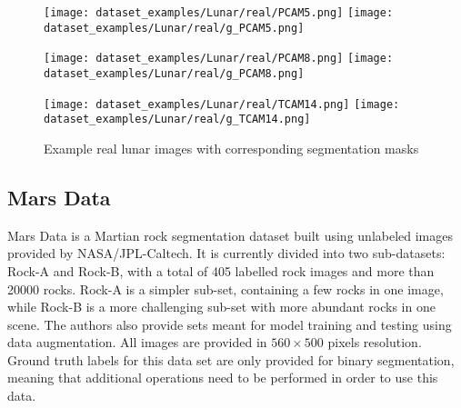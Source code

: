 \documentclass[a4paper,twoside,12pt]{book}
\begin{document}
\begin{figure}[!h]
    \centering
    \texttt{[image: dataset\_examples/Lunar/real/PCAM5.png]}
    \texttt{[image: dataset\_examples/Lunar/real/g\_PCAM5.png]}

    \texttt{[image: dataset\_examples/Lunar/real/PCAM8.png]}
    \texttt{[image: dataset\_examples/Lunar/real/g\_PCAM8.png]}

    \texttt{[image: dataset\_examples/Lunar/real/TCAM14.png]}
    \texttt{[image: dataset\_examples/Lunar/real/g\_TCAM14.png]}
    \caption{Example real lunar images with corresponding segmentation masks}
    \label{fig:data_real_example1}
\end{figure}

\subsection{Mars Data}
Mars Data \cite{xiao2021kernel} is a Martian rock segmentation dataset built using unlabeled images provided by NASA/JPL-Caltech. It is currently divided into two sub-datasets: Rock-A and Rock-B, with a total of 405 labelled rock images and more than 20000 rocks. Rock-A is a simpler sub-set, containing a few rocks in one image, while Rock-B is a more challenging sub-set with more abundant rocks in one scene. The authors also provide sets meant for model training and testing using data augmentation. All images are provided in $560 \times 500$ pixels resolution. Ground truth labels for this data set are only provided for binary segmentation, meaning that additional operations need to be performed in order to use this data.
\end{document}
